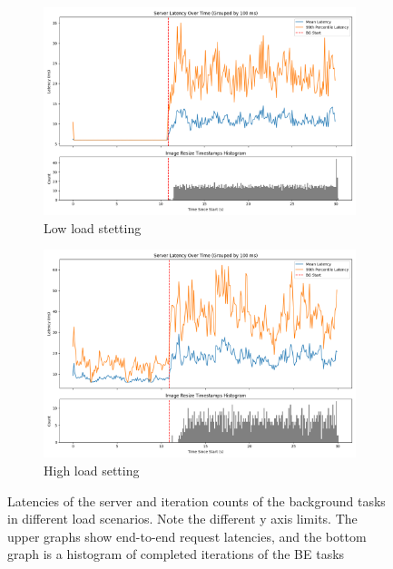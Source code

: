 \begin{figure}[t]
    \centering
    \begin{subfigure}[t]{0.48\textwidth}
        \includegraphics[width=\textwidth]{graphs/unedited-weight-low-two.png}
        \caption{Low load stetting}\label{fig:unedited-weight-low-two}
    \end{subfigure}
    \hspace{\fill}
    \begin{subfigure}[t]{0.48\textwidth}
        \includegraphics[width=\textwidth]{graphs/unedited-weight-high-two.png}
        \caption{High load setting}\label{fig:unedited-weight-high-two}
    \end{subfigure}
    \caption{Latencies of the server and iteration counts of the background
    tasks in different load scenarios. Note the different y axis limits. The
    upper graphs show end-to-end request latencies, and the bottom graph is a
    histogram of completed iterations of the BE tasks}\label{fig:unedited-weight}
\end{figure}

